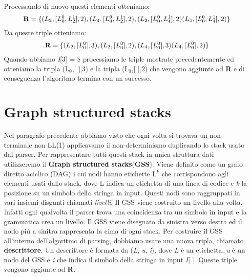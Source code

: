 Processando di nuovo questi elementi otteniamo:
\begin{align}
	\textbf{R} = \{ (L_{2},[L_0^{0},L_2^{1}],2), (L_{4},[L_0^{0},L_2^{1}],2), (L_{2},[L_0^{0},L_4^{1}],2) (L_{4},[L_0^{0},L_4^{1}],2) \} \notag
\end{align}
Da queste triple otteniamo:
\begin{align}
 	\textbf{R} = \{ (L_{2},[L_0^{0}],3), (L_{2},[L_0^{0}],2), (L_{4},[L_0^{0}],3) (L_{4},[L_0^{0}],2) \} \notag
\end{align}
Quando abbiamo \textit{I}[3] = $\$$ processiamo le triple mostrate precedentemente ed otteniamo la tripla (L$_{0}$,[ ],3) e la tripla (L$_{0}$,[ ],2) che vengono aggiunte ad \textbf{R} e di conseguenza l'algoritmo termina con un successo.
\section{Graph structured stacks}
Nel paragrafo precedente abbiamo visto che ogni volta si trovava un non-terminale non LL(1) applicavamo il non-determinismo duplicando lo stack usato dal parser. Per rappresentare tutti questi stack in unica struttura dati utilizzeremo il \textbf{Graph structured stacks}(\textbf{GSS}). Viene definito \cite{tesi: lr} come un grafo diretto aciclico (DAG) i cui nodi hanno etichette L$^{k}$ che corrispondono agli elementi usati dallo stack, dove L indica un etichetta di una linea di codice e \textit{k} la posizione su un simbolo della stringa in input. Questi nodi sono raggruppati in vari insiemi disgunti chiamati \textit{livelli}. Il GSS viene costruito un livello alla volta. Infatti ogni qualvolta il parser trova una coincidenza tra un simbolo in input e la grammatica crea un livello. Il GSS viene disegnato da sinistra verso destra ed il nodo più a sinitra rappresenta la cima di ogni stack. Per costruire il GSS all'interno dell'algoritmo di parsing, dobbiamo usare una nuova tripla, chiamato \textbf{descrittore}. Un descrittore è formata da (\textit{L}, \textit{u}, \textit{i}), dove \textit{L} è un etichetta, \textit{u} è un nodo del GSS e \textit{i} che indica il simbolo della stringa in input \textit{I}[ ]. Queste triple vengono aggiunte ad \textbf{R}.
